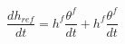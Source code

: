 \begin{equation}
\frac{dh_{ref}}{dt} = h^f \frac{\theta^f }{dt} + h^f \frac{\theta^f }{dt}
\end{equation}
